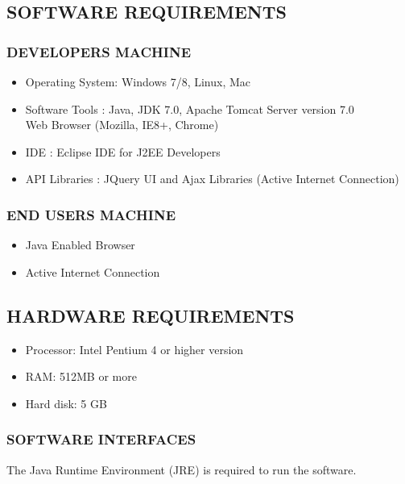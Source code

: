 \documentclass[12pt]{report}
\begin{document}
\subsection{SOFTWARE REQUIREMENTS}
\subsubsection{DEVELOPERS MACHINE}
\begin{itemize}
\item{	Operating System: Windows 7/8, Linux, Mac}
\item{  Software Tools : Java, JDK 7.0, Apache Tomcat Server version 7.0\\ Web Browser (Mozilla, IE8+, Chrome)} 
\item {IDE : Eclipse IDE for J2EE Developers}
\item {API Libraries : }JQuery UI and Ajax Libraries (Active Internet Connection)

\end{itemize}
\subsubsection{END USERS MACHINE}
\begin{itemize}
\item {Java Enabled Browser }
\item { Active Internet Connection }
\end{itemize}
\subsection{HARDWARE REQUIREMENTS}
\begin{itemize}
\item{Processor: Intel Pentium 4 or higher version}
\item{RAM: 512MB or more}
\item{Hard disk: 5 GB}
\end{itemize}
\subsubsection{SOFTWARE INTERFACES }
The Java Runtime Environment (JRE) is required to run the software.
\pagestyle{fancy}
\chead{}
\rfoot{\small{\thepage}}
\renewcommand{\headrulewidth}{0.4pt}
\renewcommand{\footrulewidth}{0.4pt}
\end{document}
